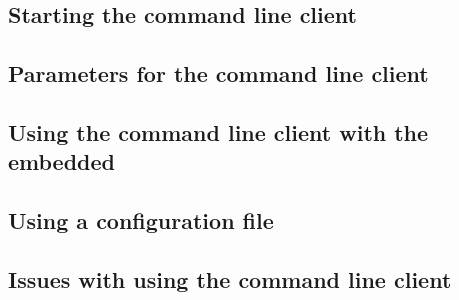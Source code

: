 



\subsection[Starting]{Starting the command line client}


\subsection[Parameters]{Parameters for the command line client}


\subsection{Using the command line client with the embedded \gddb{}}


\subsection[Configuration Files]{Using a configuration file}



\subsection[Issues]{Issues with using the command line client}

